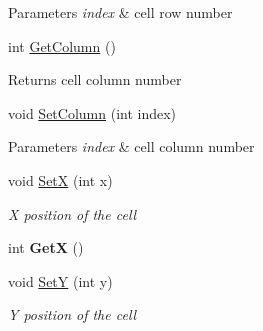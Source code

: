 \begin{DoxyCompactItemize}
\begin{DoxyCompactList}
\begin{DoxyParams}{Parameters}
{\em index} & cell row number \\
\hline
\end{DoxyParams}
\end{DoxyCompactList}\item 
\mbox{\label{class_space_v_i_l_1_1_cell_a2c8d20aff183d96cd218636321fa0f1e}} 
int \mbox{\hyperlink{class_space_v_i_l_1_1_cell_a2c8d20aff183d96cd218636321fa0f1e}{Get\+Column}} ()
\begin{DoxyCompactList}\small\item\em \begin{DoxyReturn}{Returns}
cell column number 
\end{DoxyReturn}
\end{DoxyCompactList}\item 
\mbox{\label{class_space_v_i_l_1_1_cell_aabe61a18c9e5de3d0c8735171649c269}} 
void \mbox{\hyperlink{class_space_v_i_l_1_1_cell_aabe61a18c9e5de3d0c8735171649c269}{Set\+Column}} (int index)
\begin{DoxyCompactList}\small\item\em 
\begin{DoxyParams}{Parameters}
{\em index} & cell column number \\
\hline
\end{DoxyParams}
\end{DoxyCompactList}\item 
void \mbox{\hyperlink{class_space_v_i_l_1_1_cell_aa6cdc40507c12d0e0bb40e7daa59ab83}{SetX}} (int x)
\begin{DoxyCompactList}\small\item\em X position of the cell \end{DoxyCompactList}\item 
\mbox{\label{class_space_v_i_l_1_1_cell_a6643259b0e38e58e6ba4cc81ee26a549}} 
int {\bfseries GetX} ()
\item 
void \mbox{\hyperlink{class_space_v_i_l_1_1_cell_a1876cc8c7d5b4ad383df1fe2330366f8}{SetY}} (int y)
\begin{DoxyCompactList}\small\item\em Y position of the cell \end{DoxyCompactList}\item 
\mbox{\label{class_space_v_i_l_1_1_cell_a2c193cc053ca87513b5d88e917f1b197}} 

\end{DoxyCompactItemize}
